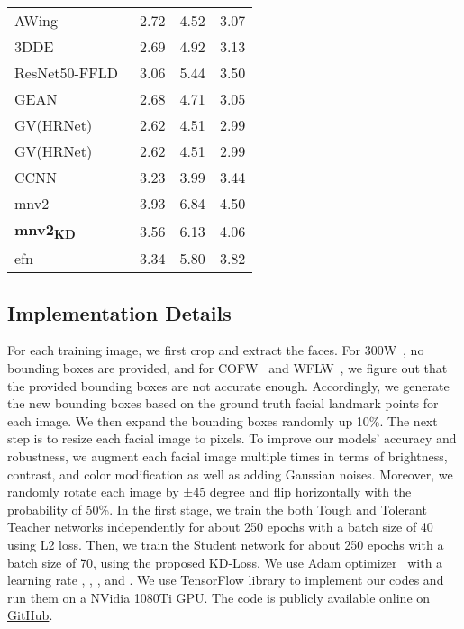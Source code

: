 \documentclass[times,twocolumn,final,authoryear]{elsarticle}
\begin{document}
\begin{table}[t!]
{\begin{tabular}{l c c c}
AWing~\cite{wang2019adaptive}    & 2.72            & 4.52        & 3.07    \\
3DDE~\cite{valle2019face}          & 2.69            & 4.92        & 3.13 \\  
ResNet50-FFLD~\cite{yan2020fine}  & 3.06             & 5.44       &3.50   \\  GEAN~\cite{iranmanesh2020robust}   & 2.68            & 4.71        & 3.05    \\ 
GV(HRNet)~\cite{xiong2020gaussian}  & 2.62            & 4.51        & 2.99 \\
GV(HRNet)~\cite{xiong2020gaussian}  & 2.62            & 4.51        & 2.99 \\
CCNN ~\cite{mahpod2021facial}                    & 3.23            & 3.99        & 3.44             \\ \hline

mnv2                                & 3.93     & 6.84       & 4.50          \\
\textbf{mnv2\textsubscript{KD} }    & 3.56     & 6.13       & 4.06       \\ 
efn                                 & 3.34     & 5.80       & 3.82         \\\hline

\end{tabular}}
\end{table}
 \subsection{Implementation Details} \label{sec:imp_detail}
For each training image, we first crop and extract the faces. For 300W~\cite{sagonas2013300}, no bounding boxes are provided, and for COFW~\cite{burgos2013robust} and WFLW~\cite{wu2018look}, we figure out that the provided bounding boxes are not accurate enough. Accordingly, we generate the new bounding boxes based on the ground truth facial landmark points for each image. We then expand the bounding boxes randomly up 10\%. The next step is to resize each facial image to  pixels. To improve our models' accuracy and robustness, we augment each facial image multiple times in terms of brightness, contrast, and color modification as well as adding Gaussian noises. Moreover, we randomly rotate each image by ±45 degree and flip horizontally with the probability of 50\%. In the first stage, we train the both Tough and Tolerant Teacher networks independently for about 250 epochs with a batch size of 40 using L2 loss. Then, we train the Student network for about 250 epochs with a batch size of 70, using the proposed KD-Loss. We use Adam optimizer~\cite{kingma2014adam} with a learning rate , , , and . We use TensorFlow library to implement our codes and run them on a NVidia 1080Ti GPU. The code is publicly available online on \href{https://github.com/aliprf/KD-Loss}{GitHub}.
\end{document}
